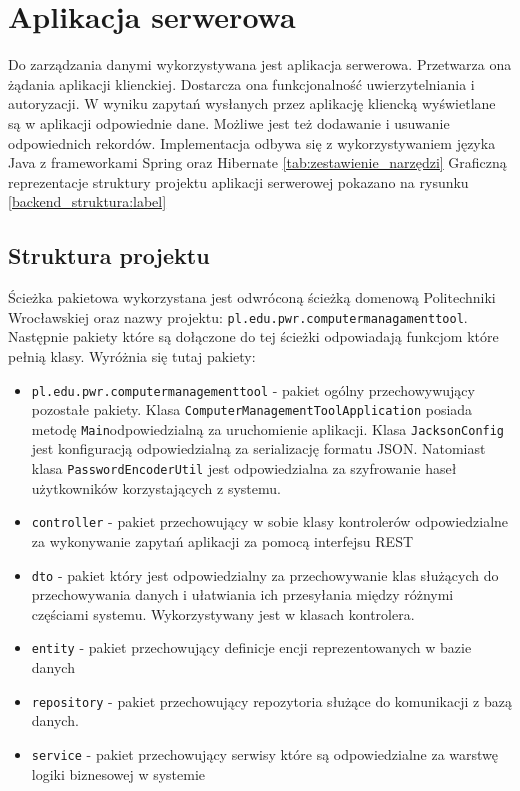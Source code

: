 \section{Aplikacja serwerowa}
Do zarządzania danymi wykorzystywana jest aplikacja serwerowa. Przetwarza ona żądania aplikacji klienckiej. Dostarcza ona funkcjonalność uwierzytelniania i autoryzacji. W wyniku zapytań wysłanych przez aplikację kliencką wyświetlane są w aplikacji odpowiednie dane. Możliwe jest też dodawanie i usuwanie odpowiednich rekordów. Implementacja odbywa się z wykorzystywaniem języka Java z frameworkami Spring oraz Hibernate \ref{tab:zestawienie_narzędzi} Graficzną reprezentacje struktury projektu aplikacji serwerowej pokazano na rysunku \ref{backend_struktura:label}

\subsection{Struktura projektu}
Ścieżka pakietowa wykorzystana jest odwróconą ścieżką domenową Politechniki Wrocławskiej oraz nazwy projektu: \texttt{pl.edu.pwr.computermanagamenttool}. Następnie pakiety które są dołączone do tej ścieżki odpowiadają funkcjom które pełnią klasy. Wyróżnia się tutaj pakiety:
\begin{itemize} %
\item \texttt{pl.edu.pwr.computermanagementtool} - pakiet ogólny przechowywujący pozostałe pakiety. Klasa \texttt{ComputerManagementToolApplication} posiada metodę \texttt{Main}odpowiedzialną za uruchomienie aplikacji. Klasa \texttt{JacksonConfig} jest konfiguracją odpowiedzialną za serializację formatu JSON. Natomiast klasa \texttt{PasswordEncoderUtil} jest odpowiedzialna za szyfrowanie haseł użytkowników korzystających z systemu.
\item \texttt{controller} - pakiet przechowujący w sobie klasy kontrolerów odpowiedzialne za wykonywanie zapytań aplikacji za pomocą interfejsu REST
\item \texttt{dto} - pakiet który jest odpowiedzialny za przechowywanie klas służących do przechowywania danych i ułatwiania ich przesyłania między różnymi częściami systemu. Wykorzystywany jest w klasach kontrolera.
\item \texttt{entity} - pakiet przechowujący definicje encji reprezentowanych w bazie danych
\item \texttt{repository} - pakiet przechowujący repozytoria służące do komunikacji z bazą danych.
\item \texttt{service} - pakiet przechowujący serwisy które są odpowiedzialne za warstwę logiki biznesowej w systemie
\end{itemize}


